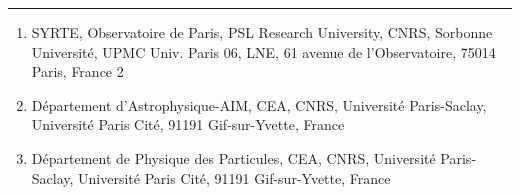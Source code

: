 \documentclass[a4paper,10.5pt]{article}
\begin{document}
\rule{6cm}{0.1mm}
{\tiny{
\begin{enumerate}
    \item SYRTE, Observatoire de Paris, PSL Research University, CNRS, Sorbonne Université, UPMC Univ. Paris 06, LNE, 61 avenue de l'Observatoire, 75014 Paris, France 2 
    \item Département d'Astrophysique-AIM, CEA, CNRS, Université Paris-Saclay, Université Paris Cité, 91191 Gif-sur-Yvette, France 
    \item Département de Physique des Particules, CEA, CNRS, Université Paris-Saclay, Université Paris Cité, 91191 Gif-sur-Yvette, France
\end{enumerate}}}

\section{}
\end{document}
